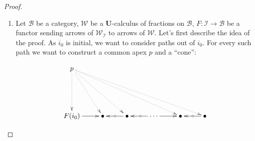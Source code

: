 \documentclass{article}
\numberwithin{equation}{section}
\theoremstyle{definition}
\theoremstyle{plain}
\begin{document}
\begin{proof}
\begin{enumerate}
		Hence $(\widehat{\mathcal{I}},\widehat{\mathcal{W}}_{\mathcal{I}})$ is a \textbf{U}-calculus of fractions and we can apply $\textnormal{\textbf{U}-Frac}(\mathcal{I}, \mathcal{W}_{\mathcal{I}}, S)$ to the co-Yoneda embedding. We get an object $p$ apex of the resulting cone. Either $p$ is an object of $\mathcal{I}$, which implies that it was initial in $\mathcal{I}$ and hence initial in $\mathcal{I}[\mathcal{W}^{-1}_{\mathcal{I}}]$ too, or $p$ is an object of the form $\widehat{i_0}$. Let's consider the latter case that $p = \widehat{i_0}$. The projection $\pi_{i_0}$ of the cone at $i_0$ correspond to a path from $i_0$ to itself in the localization:
		
		\[\xymatrix{
			&& \widehat{i_0}\ar@{.>}[ddll]_{[1_{i_0}] = \pi_{i_0}} \ar@{.>}[ddl] \ar@{.>}[dd] \ar@{.>}[ddrr] \ar@{.>}[ddrrr]^{\pi_{i_0}}\\
			\\
			i_0 \ar[r] & \bullet \ar@{<-}[r]|{\circ} & \bullet \ar@{<-}[r]|{\circ} & \cdots \ar[r] & \bullet \ar@{<-}[r]|{\circ} & i_0
		}\]
		
		By using the fact that we have a cone, we can walk our way back in the zig-zag defining $\pi_{i_0}$. At each step (going from right to left in the drawing), we see that the projection of the cone is equivalent to the path it ``covers''. Hence in the end we get $[1_{i_0}] = \pi_{i_0}$. Because it is a cone, we know that $\mathcal{I}[\mathcal{W}^{-1}_{\mathcal{I}}]$ is connected. Let $j: \mathcal{I}$. Now take any path $z$ from $i_0$ to $j$ in the localization. This time by walking our way forward in the path, we show that $\pi_j = [z]$. Hence we have shown that $i_0$ is initial in the localization, hence there exists an initial object. Furthermore, for any object $s$ of $S$, we know that $\pi_s$ is in $\widehat{\mathcal{W}}_{\mathcal{I}}$ and hence we get each time the second part of the criterion.
		
		\item[$(\Leftarrow)$] Let $\mathcal{B}$ be a category, $\mathcal{W}$ be a \textbf{U}-calculus of fractions on $\mathcal{B}$, $F:\mathcal{I} \to \mathcal{B}$ be a functor sending arrows of $\mathcal{W}_{\mathcal{I}}$ to arrows of $\mathcal{W}$. Let's first describe the idea of the proof. As $i_0$ is initial, we want to consider paths out of $i_0$. For every such path we want to construct a common apex $p$ and a ``cone'':
		
		\[\xymatrix{
			p\ar@{.>}[dd] \ar@{.>}[ddr] \ar@{.>}[ddrr] \ar@{.>}[ddrrrr] \ar@{.>}[ddrrrrr]\\
			\\
			F(i_0) \ar[r] & \bullet \ar@{<-}[r]|{\circ} & \bullet \ar@{<-}[r]|{\circ} & \cdots \ar[r] & \bullet \ar@{<-}[r]|{\circ} & \bullet
		}\]
		

\end{enumerate}
\end{proof}
\end{document}
